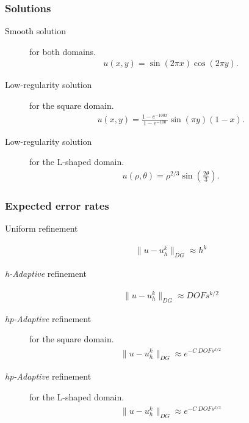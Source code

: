 \begin{frame}
    \frametitle{Solutions}

    \begin{description}
        \item[Smooth solution] for both domains.
            \begin{gather}
                u(x, y) = \sin(2 \pi x) \cos(2 \pi y).
            \end{gather}
        \item[Low-regularity solution] for the square domain. 
            \begin{gather}
                u(x, y) = \frac{1 - e^{-100x}}{1 - e^{-100}} \sin(\pi y) (1 - x).
            \end{gather}
        \item[Low-regularity solution] for the L-shaped domain.
            \begin{gather}
                u(\rho, \theta) = \rho^{2 / 3} \sin\left(\frac{2 \theta}{3}\right).
            \end{gather}
    \end{description}
\end{frame}

\begin{frame}
    \frametitle{Expected error rates}

    \begin{description}
        \item[Uniform refinement]
            \begin{gather}
                \lVert u - u_h^k \rVert_{DG} \approx h^{k}
            \end{gather}
        \item[\textit{h-Adaptive} refinement]
            \begin{gather}
                \lVert u - u_h^k \rVert_{DG} \approx DOFs^{k/2}
            \end{gather}
        \item[\textit{hp-Adaptive} refinement] for the square domain.
            \begin{gather}
                \lVert u - u_h^k \rVert_{DG} \approx e^{-C ~ DOFs^{k/2}}
            \end{gather}
        \item[\textit{hp-Adaptive} refinement] for the L-shaped domain.
            \begin{gather}
                \lVert u - u_h^k \rVert_{DG} \approx e^{-C ~ DOFs^{k/3}}
            \end{gather}
    \end{description}
\end{frame}

